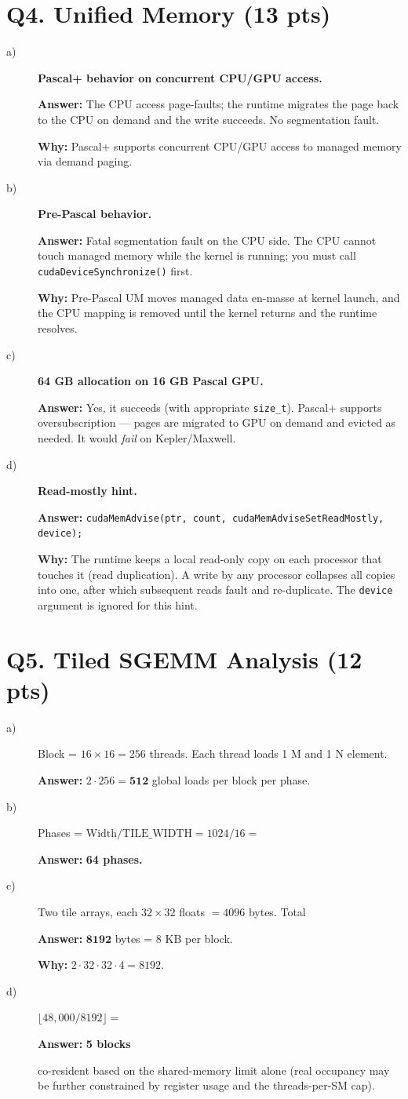 \documentclass[11pt]{article}
\newcommand{\ans}[1]{\par\noindent\textcolor{anscolor}{\textbf{Answer:}} #1\par}
\newcommand{\why}[1]{\par\noindent\textcolor{anscolor}{\textbf{Why:}} #1\par\vspace{4pt}}
\begin{document}
\section*{Q4. Unified Memory (13 pts)}
\begin{description}
  \item[a)] \textbf{Pascal+ behavior on concurrent CPU/GPU access.}
        \ans{The CPU access page-faults; the runtime migrates the page back to the CPU on
        demand and the write succeeds. No segmentation fault.}
        \why{Pascal+ supports concurrent CPU/GPU access to managed memory via demand paging.}
  \item[b)] \textbf{Pre-Pascal behavior.}
        \ans{Fatal segmentation fault on the CPU side. The CPU cannot touch managed memory
        while the kernel is running; you must call \texttt{cudaDeviceSynchronize()} first.}
        \why{Pre-Pascal UM moves managed data en-masse at kernel launch, and the CPU mapping
        is removed until the kernel returns and the runtime resolves.}
  \item[c)] \textbf{64 GB allocation on 16 GB Pascal GPU.}
        \ans{Yes, it succeeds (with appropriate \texttt{size\_t}). Pascal+ supports
        oversubscription — pages are migrated to GPU on demand and evicted as needed. It would
        \emph{fail} on Kepler/Maxwell.}
  \item[d)] \textbf{Read-mostly hint.}
        \ans{\texttt{cudaMemAdvise(ptr, count, cudaMemAdviseSetReadMostly, device);}}
        \why{The runtime keeps a local read-only copy on each processor that touches it
        (read duplication). A write by any processor collapses all copies into one, after which
        subsequent reads fault and re-duplicate. The \texttt{device} argument is ignored for
        this hint.}
\end{description}

\section*{Q5. Tiled SGEMM Analysis (12 pts)}
\begin{description}
  \item[a)] Block = $16 \times 16 = 256$ threads. Each thread loads 1 M and 1 N element.
        \ans{$2 \cdot 256 = \mathbf{512}$ global loads per block per phase.}
  \item[b)] Phases = $\text{Width} / \text{TILE\_WIDTH} = 1024 / 16 = $ \ans{\textbf{64 phases.}}
  \item[c)] Two tile arrays, each $32 \times 32$ floats $= 4096$ bytes. Total
        \ans{$\mathbf{8192}$ bytes = 8 KB per block.}
        \why{$2 \cdot 32 \cdot 32 \cdot 4 = 8192$.}
  \item[d)] $\lfloor 48{,}000 / 8192 \rfloor = $ \ans{\textbf{5 blocks}} co-resident based on the
        shared-memory limit alone (real occupancy may be further constrained by register usage
        and the threads-per-SM cap).
\end{description}
\end{document}
